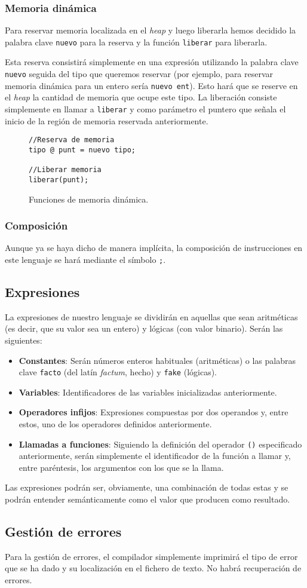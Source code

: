 \subsubsection{Memoria dinámica}
Para reservar memoria localizada en el \textit{heap} y luego liberarla
hemos decidido la palabra clave \lstinline{nuevo} para la reserva y la función
\lstinline{liberar} para liberarla. 

Esta reserva consistirá simplemente en una expresión utilizando la palabra clave
\lstinline{nuevo} seguida del tipo que queremos reservar (por ejemplo, para
reservar memoria dinámica para un entero sería \lstinline{nuevo ent}). Esto hará
que se reserve en el \textit{heap} la cantidad de memoria que ocupe este tipo.
La liberación consiste simplemente en llamar a \lstinline{liberar} y como
parámetro el puntero que señala el inicio de la región de memoria reservada
anteriormente.
\begin{figure}[htbp]
    \centering
    \begin{lstlisting}
//Reserva de memoria
tipo @ punt = nuevo tipo;

//Liberar memoria
liberar(punt);
    \end{lstlisting}
    \caption{Funciones de memoria dinámica.}
\end{figure}

\subsubsection{Composición}
Aunque ya se haya dicho de manera implícita, la composición de instrucciones en
este lenguaje se hará mediante el símbolo \lstinline{;}.

\subsection{Expresiones}
La expresiones de nuestro lenguaje se dividirán en aquellas que sean aritméticas
(es decir, que su valor sea un entero) y lógicas (con valor binario). Serán las
siguientes:
\begin{itemize}
    \item \textbf{Constantes}: Serán números enteros habituales (aritméticas) o
        las palabras clave \lstinline{facto} (del latín \textit{factum}, hecho) y \lstinline{fake} (lógicas).
    \item \textbf{Variables}: Identificadores de las variables inicializadas
        anteriormente.
    \item \textbf{Operadores infijos}: Expresiones compuestas por dos operandos
        y, entre estos, uno de los operadores definidos anteriormente.
    \item \textbf{Llamadas a funciones}: Siguiendo la definición del operador
        \lstinline{()} especificado anteriormente, serán simplemente el
        identificador de la función a llamar y, entre paréntesis, los argumentos
        con los que se la llama.
\end{itemize}
Las expresiones podrán ser, obviamente, una combinación de todas estas y se
podrán entender semánticamente como el valor que producen como resultado.

\subsection{Gestión de errores}
Para la gestión de errores, el compilador simplemente imprimirá el tipo de error
que se ha dado y su localización en el fichero de texto. No habrá recuperación
de errores.

